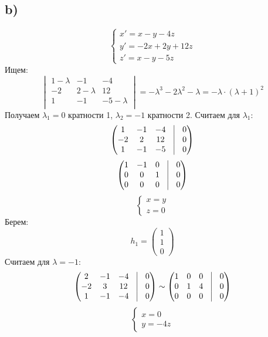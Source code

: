 \documentclass[a4paper,12pt]{article}
\begin{document}
\subsection*{b)}
\[
\begin{cases}
x' = x - y - 4z \\
y' = -2x + 2y + 12z \\
z' = x - y - 5z
\end{cases}
\]
Ищем:
\[
\begin{vmatrix}
1 - \lambda & -1 & -4 \\
-2  & 2 -\lambda & 12 \\
1 & -1 & - 5 - \lambda\\
\end{vmatrix} = - \lambda^3 -2 \lambda^2 - \lambda = -\lambda \cdot (\lambda + 1)^2
\]
Получаем $\lambda_1 = 0$ кратности 1, $\lambda_2 = -1$ кратности 2. Считаем для $\lambda_1$:
\[
\begin{pmatrix}
1 & -1 & -4 & \vrule & 0 \\
-2  & 2  & 12 & \vrule & 0 \\
1 & -1 & - 5 & \vrule & 0 \\
\end{pmatrix} 
\]
\[
\begin{pmatrix}
1 & -1 & 0 & \vrule & 0 \\
0 & 0 & 1& \vrule & 0 \\
0 & 0& 0 & \vrule & 0 \\
\end{pmatrix} 
\]
\[
\begin{cases}
x = y \\
z = 0
\end{cases}
\]
Берем:
\[
h_1 = \begin{pmatrix}
1 \\ 1 \\ 0 
\end{pmatrix}
\]
Считаем для $\lambda = -1$:
\[
\begin{pmatrix}
2& -1 & -4 & \vrule & 0 \\
-2  & 3  & 12 & \vrule & 0 \\
1 & -1 & - 4 & \vrule & 0 \\
\end{pmatrix} \sim
\begin{pmatrix}
1 & 0 & 0 & \vrule & 0 \\
0 & 1& 4& \vrule & 0 \\
0 & 0& 0 & \vrule & 0 \\
\end{pmatrix} 
\]
\[
\begin{cases}
x = 0 \\
y = -4z
\end{cases}
\]
\end{document}
